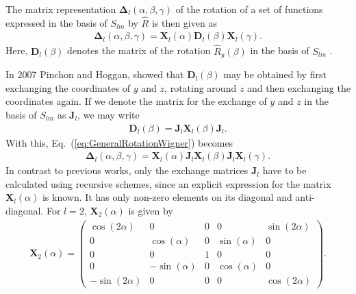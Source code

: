 The matrix representation $\pmb{\Delta}_l(\alpha,\beta,\gamma)$ of the rotation of a set of functions expressed in
the basis of $S_{lm}$ by $\hat{R}$ is then given as
\begin{align}
  \pmb{\Delta}_l(\alpha,\beta,\gamma) = \pmb{X}_l(\alpha) \pmb{D}_l(\beta) \pmb{X}_l(\gamma).
  \label{eq:GeneralRotationWigner}
\end{align}
Here, $\pmb{D}_l(\beta)$ denotes the matrix of the rotation $\hat{R}_y(\beta)$ in the basis of $S_{lm}$
\cite{Blanco1997}.

In 2007 Pinchon and Hoggan\cite{Pinchon2007}, showed that $\pmb{D}_l(\beta)$ may be obtained by first exchanging the
coordinates of $y$ and $z$, rotating around $z$ and then exchanging the coordinates again. If we denote the matrix
for the exchange of $y$ and $z$ in the basis of $S_{lm}$ as $\pmb{J}_l$, we may write
\begin{align}
  \pmb{D}_l(\beta) = \pmb{J}_l \pmb{X}_l(\beta) \pmb{J}_l.
\end{align}
With this, Eq.~(\ref{eq:GeneralRotationWigner}) becomes
\begin{align}
  \pmb{\Delta}_l(\alpha,\beta,\gamma) = \pmb{X}_l(\alpha) \pmb{J}_l \pmb{X}_l(\beta) \pmb{J}_l \pmb{X}_l(\gamma).
  \label{eq:SphericalHarmonicsRotation}
\end{align}
In contrast to previous works\cite{Ivanic1996,Blanco1997}, only the exchange matrices
$\pmb{J}_l$ have to be calculated using recursive schemes, since an explicit expression for the matrix
$\pmb{X}_l(\alpha)$ is known.
It has only non-zero elements on its diagonal and anti-diagonal. For $l=2$, $\pmb{X}_2(\alpha)$ is given by
\begin{align}
  \pmb{X}_2(\alpha) = \begin{pmatrix}
                      \cos(2\alpha) & 0            & 0 & 0            & \sin(2\alpha) \\
                      0             & \cos(\alpha) & 0 & \sin(\alpha) & 0 \\
                      0             & 0            & 1 & 0            & 0 \\
                      0             & -\sin(\alpha)& 0 & \cos(\alpha) & 0 \\
                      -\sin(2\alpha)& 0            & 0 & 0            & \cos(2\alpha)
                      \end{pmatrix}.
\end{align}


